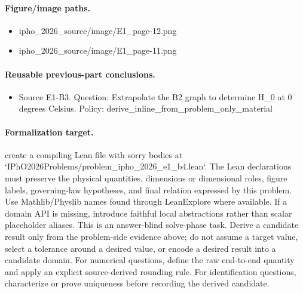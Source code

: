 \paragraph{Figure/image paths.}
\begin{itemize}
\item ipho\_2026\_source/image/E1\_page-12.png
\item ipho\_2026\_source/image/E1\_page-11.png
\end{itemize}

\paragraph{Reusable previous-part conclusions.}
\begin{itemize}
\item Source E1-B3. Question: Extrapolate the B2 graph to determine H\_0 at 0 degrees Celsius. Policy: derive\_inline\_from\_problem\_only\_material
\end{itemize}

\paragraph{Formalization target.}
create a compiling Lean file with sorry bodies at `IPhO2026Problems/problem\_ipho\_2026\_e1\_b4.lean`.
The Lean declarations must preserve the physical quantities, dimensions or dimensional roles, figure labels, governing-law hypotheses, and final relation expressed by this problem.
Use Mathlib/Physlib names found through LeanExplore where available. If a domain API is missing, introduce faithful local abstractions rather than scalar placeholder aliases.
This is an answer-blind solve-phase task. Derive a candidate result only from the problem-side evidence above; do not assume a target value, select a tolerance around a desired value, or encode a desired result into a candidate domain.
For numerical questions, define the raw end-to-end quantity and apply an explicit source-derived rounding rule. For identification questions, characterize or prove uniqueness before recording the derived candidate.

